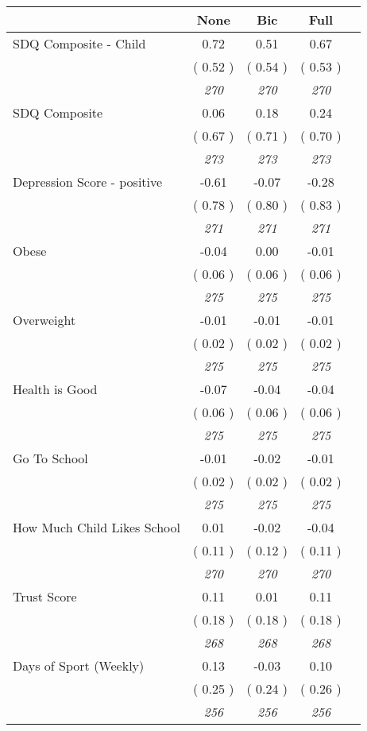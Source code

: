 \begin{tabular}{l c c c c}
\toprule
 & None & Bic & Full \\
\midrule
SDQ Composite - Child &      0.72 &      0.51 &      0.67 \\
& (     0.52 ) & (     0.54 ) & (     0.53 ) \\
& \textit{ 270 } & \textit{ 270 } & \textit{ 270 } \\
SDQ Composite &      0.06 &      0.18 &      0.24 \\
& (     0.67 ) & (     0.71 ) & (     0.70 ) \\
& \textit{ 273 } & \textit{ 273 } & \textit{ 273 } \\
Depression Score - positive &     -0.61 &     -0.07 &     -0.28 \\
& (     0.78 ) & (     0.80 ) & (     0.83 ) \\
& \textit{ 271 } & \textit{ 271 } & \textit{ 271 } \\
Obese &     -0.04 &      0.00 &     -0.01 \\
& (     0.06 ) & (     0.06 ) & (     0.06 ) \\
& \textit{ 275 } & \textit{ 275 } & \textit{ 275 } \\
Overweight &     -0.01 &     -0.01 &     -0.01 \\
& (     0.02 ) & (     0.02 ) & (     0.02 ) \\
& \textit{ 275 } & \textit{ 275 } & \textit{ 275 } \\
Health is Good &     -0.07 &     -0.04 &     -0.04 \\
& (     0.06 ) & (     0.06 ) & (     0.06 ) \\
& \textit{ 275 } & \textit{ 275 } & \textit{ 275 } \\
Go To School &     -0.01 &     -0.02 &     -0.01 \\
& (     0.02 ) & (     0.02 ) & (     0.02 ) \\
& \textit{ 275 } & \textit{ 275 } & \textit{ 275 } \\
How Much Child Likes School &      0.01 &     -0.02 &     -0.04 \\
& (     0.11 ) & (     0.12 ) & (     0.11 ) \\
& \textit{ 270 } & \textit{ 270 } & \textit{ 270 } \\
Trust Score &      0.11 &      0.01 &      0.11 \\
& (     0.18 ) & (     0.18 ) & (     0.18 ) \\
& \textit{ 268 } & \textit{ 268 } & \textit{ 268 } \\
Days of Sport (Weekly) &      0.13 &     -0.03 &      0.10 \\
& (     0.25 ) & (     0.24 ) & (     0.26 ) \\
& \textit{ 256 } & \textit{ 256 } & \textit{ 256 } \\
\bottomrule
\end{tabular}
